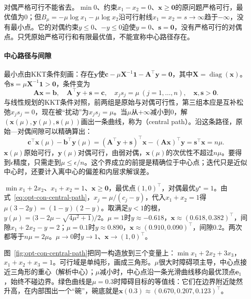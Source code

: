 对偶严格可行不能省去。$\min0$、约束$x_1-x_2=0$、$\bm x\geq\bm0$的原问题严格可行，最优值为$0$；但$B_\mu=-\mu\log x_1-\mu\log x_2$沿可行射线$x_1=x_2=s\to\infty$趋于$-\infty$，没有最小点。它的对偶约束$y\leq0$、$-y\leq0$迫使$y=0$、$\bm s=\bm0$，没有严格可行的对偶点。只凭原始严格可行和有限最优值，不能宣称中心路径存在。

\paragraph{中心路径与间隙}
最小点由KKT条件刻画：存在$\bm y$使$\bm c-\mu\bm X^{-1}\bm1-\bm A^\top\bm y=\bm0$，其中$\bm X=\operatorname{diag}(\bm x)$。令$\bm s=\mu\bm X^{-1}\bm1>\bm0$，条件变为
\begin{equation}
\label{eq:opt-con-central-path}
  \bm A\bm x=\bm b,\quad\bm A^\top\bm y+\bm s=\bm c,\quad x_js_j=\mu\ (j=1,\dots,n),\quad\bm x,\bm s>\bm0.
\end{equation}
与线性规划的KKT条件对照，前两组是原始与对偶可行性，第三组本应是互补松弛$x_js_j=0$，现在被“扰动”为$x_js_j=\mu$。当$\mu$从$+\infty$减小到$0$，解$(\bm x(\mu),\bm y(\mu),\bm s(\mu))$画出一条曲线，称为（central path）。沿这条路径，原始—对偶间隙可以精确算出：
\[
  \bm c^\top\bm x(\mu)-\bm b^\top\bm y(\mu)=(\bm A^\top\bm y+\bm s)^\top\bm x-(\bm A\bm x)^\top\bm y=\bm s^\top\bm x=n\mu.
\]
$\bm x(\mu)$原始可行，$\bm y(\mu)$对偶可行，由弱对偶，$\bm x(\mu)$的次优性不超过$n\mu$。要得到$\epsilon$精度，只需走到$\mu\leq\epsilon/n$。这个界成立的前提是精确位于中心点；迭代只是近似中心时，还要计入离中心的偏差和内层求解误差。

\begin{example}[两变量的中心路径]
\label{ex:opt-con-central-path}
$\min x_1+2x_2$、$x_1+x_2=1$、$\bm x\geq\bm0$，最优点$(1,0)^\top$，对偶最优$y^\star=1$。由式~\eqref{eq:opt-con-central-path}，$x_j=\mu/(c_j-y)$，代入$x_1+x_2=1$得$\mu(3-2y)=(1-y)(2-y)$。取满足$y<1$的根，$y(\mu)=\bigl(3-2\mu-\sqrt{4\mu^2+1}\bigr)/2$。$\mu=1$时$y\approx-0.618$，$\bm x\approx(0.618,0.382)^\top$，间隙$x_1+2x_2-y=2$；$\mu=0.1$时$y\approx0.890$，$\bm x\approx(0.910,0.090)^\top$，间隙$0.2$。两次都等于$n\mu=2\mu$。$\mu\to0$时$y\to1$、$\bm x\to(1,0)^\top$。
\end{example}

图~\ref{fig:opt-con-central-path}把同一构造放到三个变量上：$\min x_1+2x_2+3x_3$，$x_1+x_2+x_3=1$。可行域是单纯形，画成三角形。$\mu$很大时障碍项主导，中心点接近三角形的重心（解析中心）；$\mu$减小时，中心点沿一条光滑曲线移向最优顶点$\bm e_1$，始终不碰边界。绿色曲线是$\mu=0.3$时障碍目标的等值线：它们在边界附近陡然升高，在内部围出一个“碗”，碗底就是$\bm x(0.3)\approx(0.670,0.207,0.123)^\top$。

